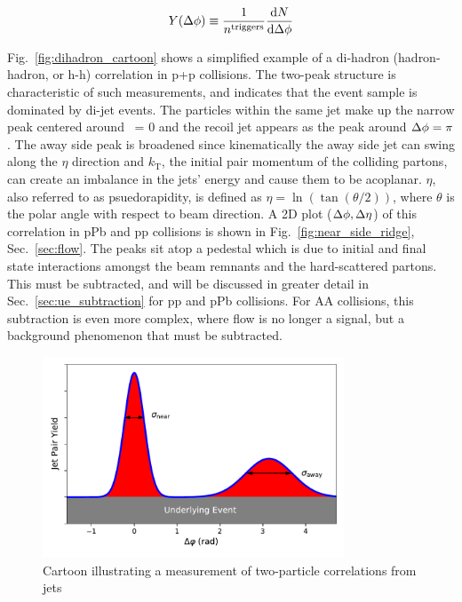 \begin{equation}
    Y(\Delta\phi)\equiv \frac{1}{n^\mathrm{triggers}}\frac{\mathrm{d}N}{\mathrm{d}\Delta\phi}
    \label{eq:yield}
  \end{equation}

  Fig.~\ref{fig:dihadron_cartoon} shows a simplified example of a di-hadron (hadron-hadron, or h-h) correlation in p+p collisions. The two-peak structure is characteristic of such measurements, and indicates that the event sample is dominated by di-jet events. The particles within the same jet make up the narrow peak centered around \deltaphi~= 0 and the recoil jet appears as the peak around $\Delta\phi = \pi$. The away side peak is broadened since kinematically the away side jet can swing along the $\eta$ direction and $k_\mathrm{T}$, the initial pair momentum of the colliding partons, can create an imbalance in the jets’ energy and cause them to be acoplanar. $\eta$, also referred to as psuedorapidity, is defined as $\eta = \ln(\tan(\theta/2))$, where $\theta$ is the polar angle with respect to beam direction. A 2D plot ($\Delta\phi,\Delta\eta$) of this correlation in pPb and pp collisions is shown in Fig.~\ref{fig:near_side_ridge}, Sec.~\ref{sec:flow}. The peaks sit atop a pedestal which is due to initial and final state interactions amongst the beam remnants and the hard-scattered partons. This must be subtracted, and will be discussed in greater detail in Sec.~\ref{sec:ue_subtraction} for pp and pPb collisions. For AA collisions, this subtraction is even more complex, where flow is no longer a signal, but a background phenomenon that must be subtracted. 

  \begin{figure}[htpb]
    \centering
    \includegraphics[width=0.8\textwidth]{Introduction/dihadron_cartoon.pdf}
    \caption{Cartoon illustrating a measurement of two-particle correlations from jets}
    \label{fig:}
  \end{figure}

